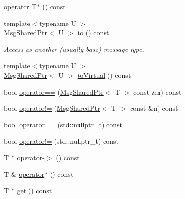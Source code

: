 \begin{DoxyCompactItemize}
\item 
\hyperlink{structvt_1_1messaging_1_1_msg_shared_ptr_a85b58c8af4068d8cfd4ad2ebb02d8111}{operator T$\ast$} () const
\item 
{\footnotesize template$<$typename U $>$ }\\\hyperlink{structvt_1_1messaging_1_1_msg_shared_ptr}{Msg\+Shared\+Ptr}$<$ U $>$ \hyperlink{structvt_1_1messaging_1_1_msg_shared_ptr_ae3d838b37f94f5f63ffc433518d46ada}{to} () const
\begin{DoxyCompactList}\small\item\em Access as another (usually base) message type. \end{DoxyCompactList}\item 
{\footnotesize template$<$typename U $>$ }\\\hyperlink{structvt_1_1messaging_1_1_msg_shared_ptr}{Msg\+Shared\+Ptr}$<$ U $>$ \hyperlink{structvt_1_1messaging_1_1_msg_shared_ptr_ab210c87a0489113368209634e76a72b8}{to\+Virtual} () const
\item 
bool \hyperlink{structvt_1_1messaging_1_1_msg_shared_ptr_a7f385be5d82602555a25a6737c779962}{operator==} (\hyperlink{structvt_1_1messaging_1_1_msg_shared_ptr}{Msg\+Shared\+Ptr}$<$ T $>$ const \&n) const
\item 
bool \hyperlink{structvt_1_1messaging_1_1_msg_shared_ptr_a1a37a82a49f68a91ef92ec675d2a324e}{operator!=} (\hyperlink{structvt_1_1messaging_1_1_msg_shared_ptr}{Msg\+Shared\+Ptr}$<$ T $>$ const \&n) const
\item 
bool \hyperlink{structvt_1_1messaging_1_1_msg_shared_ptr_a7da24c983c0b606a570138d928148298}{operator==} (std\+::nullptr\+\_\+t) const
\item 
bool \hyperlink{structvt_1_1messaging_1_1_msg_shared_ptr_a3d21051f673b7370ac6dcdaeac110e84}{operator!=} (std\+::nullptr\+\_\+t) const
\item 
T $\ast$ \hyperlink{structvt_1_1messaging_1_1_msg_shared_ptr_a4140dc4ea157de37d258c8f8821179c8}{operator-\/$>$} () const
\item 
T \& \hyperlink{structvt_1_1messaging_1_1_msg_shared_ptr_a609cd3703233ec7a0e26db0ff457b8f7}{operator$\ast$} () const
\item 
T $\ast$ \hyperlink{structvt_1_1messaging_1_1_msg_shared_ptr_a6e6e25e087e662d9171fa20b5092efdd}{get} () const
\end{DoxyCompactItemize}
